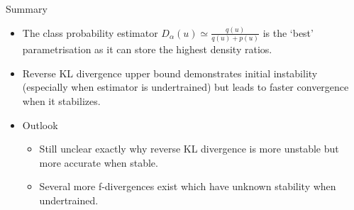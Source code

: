 \documentclass{beamer}
\begin{document}
\begin{frame}{Summary}
  \begin{itemize}
  \item
    The class probability estimator $D_\alpha(u)\simeq\frac{q(u)}{q(u)+p(u)}$ is the `best' parametrisation as it can store the \alert{highest density ratios}.
  \item
    Reverse KL divergence upper bound demonstrates \alert{initial instability} (especially when estimator is undertrained) but leads to \alert{faster convergence} when it stabilizes.
  \end{itemize}
  
  \begin{itemize}
  \item
    Outlook
    \begin{itemize}
    \item
      Still unclear exactly why reverse KL divergence is more unstable but more accurate when stable.
    \item
      Several more f-divergences exist which have unknown stability when undertrained.
    \end{itemize}
  \end{itemize}
\end{frame}



%
%    
%    
%
% 
%    
%
\end{document}
